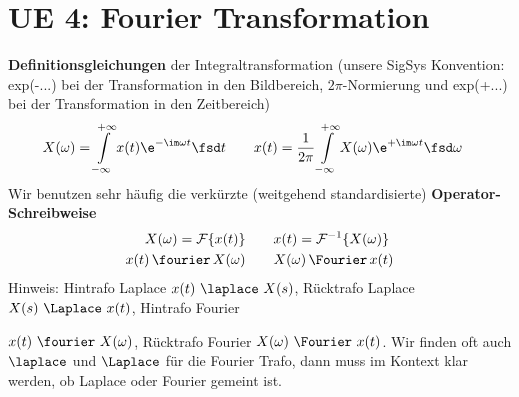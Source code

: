 \clearpage
\section{UE 4: Fourier Transformation}
\label{sec:ue4_fouriertransformation}

\textbf{Definitionsgleichungen} der Integraltransformation (unsere SigSys Konvention:
exp(-...) bei der Transformation in den Bildbereich, $2\pi$-Normierung und exp(+...) bei der
Transformation in den Zeitbereich)
\begin{align}
X(\omega) = \int\limits_{-\infty}^{+\infty} x(t) \e^{-\im \omega t} \fsd t
&\qquad
x(t)= \frac{1}{2\pi}\int\limits_{-\infty}^{+\infty} X(\omega) \e^{+\im \omega t} \fsd \omega
\end{align}
Wir benutzen sehr häufig die verkürzte (weitgehend standardisierte)
\textbf{Operator-Schreibweise}
\begin{align}
X(\omega) = \mathcal{F}\{x(t)\}&\qquad x(t) = \mathcal{F}^{-1}\{X(\omega)\}\\
x(t) \,\fourier\, X(\omega) &\qquad X(\omega) \,\Fourier\, x(t)
\end{align}
Hinweis: Hintrafo Laplace $x(t)\,\,\laplace\,\,X(s)$, Rücktrafo Laplace $X(s)\,\,\Laplace \,\,x(t)$, Hintrafo Fourier

\noindent $x(t)\,\,\fourier\,\,X(\omega)$, Rücktrafo Fourier $X(\omega)\,\,\Fourier\,\,x(t)$.
Wir finden oft auch $\laplace$ und $\Laplace$ für die Fourier Trafo, dann muss im Kontext klar werden, ob Laplace oder Fourier gemeint ist.
%

